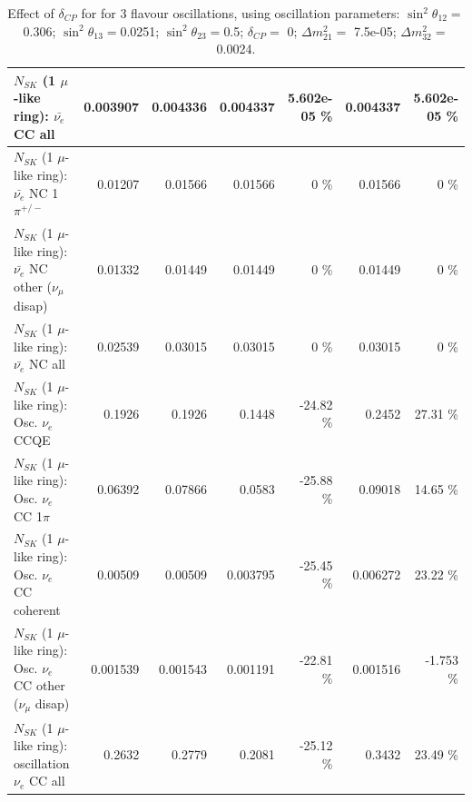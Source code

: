 \begin{table}
\begin{tabular}{| l | r | r | r  r | r  r |}
                            $N_{SK}$ (1 $\mu$-like ring): $\bar{\nu_{e}}$ CC all &        0.003907 &        0.004336 &        0.004337 & 5.602e-05 \%  &        0.004337 & 5.602e-05 \%  \\ 
\hline
                     $N_{SK}$ (1 $\mu$-like ring): $\bar{\nu_e}$ NC 1$\pi^{+/-}$ &         0.01207 &         0.01566 &         0.01566 &        0 \%  &         0.01566 &        0 \%  \\ 
          $N_{SK}$ (1 $\mu$-like ring): $\bar{\nu_e}$ NC other ($\nu_\mu$ disap) &         0.01332 &         0.01449 &         0.01449 &        0 \%  &         0.01449 &        0 \%  \\ 
                            $N_{SK}$ (1 $\mu$-like ring): $\bar{\nu_{e}}$ NC all &         0.02539 &         0.03015 &         0.03015 &        0 \%  &         0.03015 &        0 \%  \\ 
\hline
\hline
\hline
                                 $N_{SK}$ (1 $\mu$-like ring): Osc. $\nu_e$ CCQE &          0.1926 &          0.1926 &          0.1448 &   -24.82 \%  &          0.2452 &    27.31 \%  \\ 
                            $N_{SK}$ (1 $\mu$-like ring): Osc. $\nu_e$ CC 1$\pi$ &         0.06392 &         0.07866 &          0.0583 &   -25.88 \%  &         0.09018 &    14.65 \%  \\ 
                          $N_{SK}$ (1 $\mu$-like ring): Osc. $\nu_e$ CC coherent &         0.00509 &         0.00509 &        0.003795 &   -25.45 \%  &        0.006272 &    23.22 \%  \\ 
           $N_{SK}$ (1 $\mu$-like ring): Osc. $\nu_e$ CC other ($\nu_\mu$ disap) &        0.001539 &        0.001543 &        0.001191 &   -22.81 \%  &        0.001516 &   -1.753 \%  \\ 
                        $N_{SK}$ (1 $\mu$-like ring): oscillation $\nu_e$ CC all &          0.2632 &          0.2779 &          0.2081 &   -25.12 \%  &          0.3432 &    23.49 \%  \\ 
\hline
\hline
\end{tabular}
\caption{ Effect of $\delta_{CP}$ for for 3 flavour oscillations, using oscillation parameters:  $\sin^2\theta_{12} = $0.306; $\sin^2\theta_{13} = $0.0251; $\sin^2\theta_{23} = $0.5; $\delta_{CP} = $        0; $\Delta m^2_{21} = $    7.5e-05; $\Delta m^2_{32} = $    0.0024. }
\label{tab:num_deltacp_1RmuT_3f_osc_t13:0.0251}
\end{table}
\clearpage
